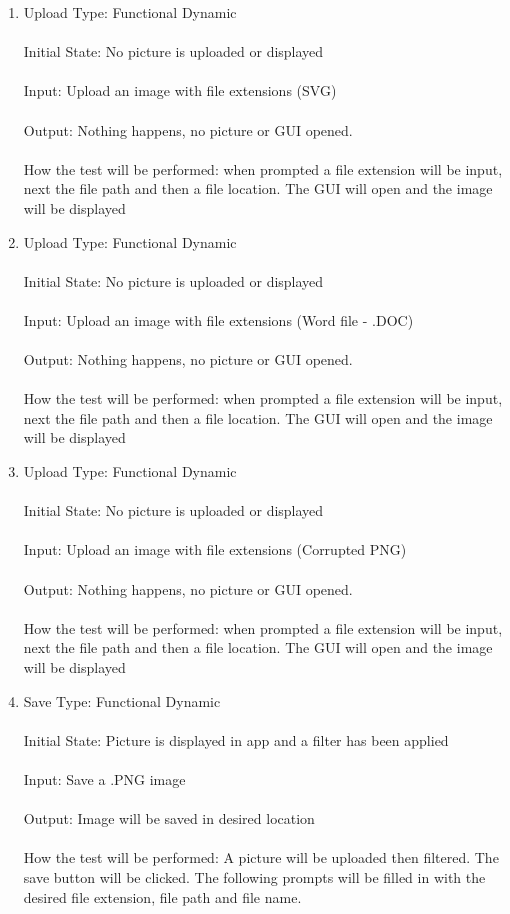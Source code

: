 \documentclass[12pt, titlepage]{article}
\begin{document}
\begin{enumerate}
\item{Upload}
Type: Functional Dynamic \\ \\
Initial State: No picture is uploaded or displayed \\ \\
Input: Upload an image with file extensions (SVG) \\ \\
Output: Nothing happens, no picture or GUI opened. \\ \\
How the test will be performed: when prompted a file extension will be input, next the file path and then a file location. The GUI will open and the image will be displayed

\item{Upload}
Type: Functional Dynamic \\ \\
Initial State: No picture is uploaded or displayed \\ \\
Input: Upload an image with file extensions (Word file - .DOC) \\ \\
Output: Nothing happens, no picture or GUI opened. \\ \\
How the test will be performed: when prompted a file extension will be input, next the file path and then a file location. The GUI will open and the image will be displayed

\item{Upload}
Type: Functional Dynamic \\ \\
Initial State: No picture is uploaded or displayed \\ \\
Input: Upload an image with file extensions (Corrupted PNG) \\ \\
Output: Nothing happens, no picture or GUI opened.\\ \\
How the test will be performed: when prompted a file extension will be input, next the file path and then a file location. The GUI will open and the image will be displayed

\item{Save}
Type: Functional Dynamic \\ \\
Initial State: Picture is displayed in app and a filter has been applied \\ \\
Input: Save a .PNG image \\ \\
Output: Image will be saved in desired location \\ \\
How the test will be performed: A picture will be uploaded then filtered. The save button will be clicked. The following prompts will be filled in with the desired file extension, file path and file name.


\end{enumerate}
\end{document}
